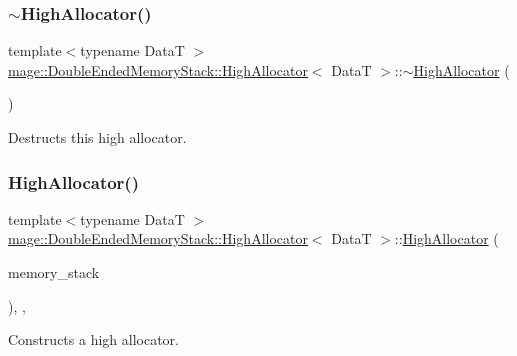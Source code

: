 \subsubsection{\texorpdfstring{$\sim$\+High\+Allocator()}{~HighAllocator()}}
{\footnotesize\ttfamily template$<$typename DataT $>$ \\
\hyperlink{classmage_1_1_double_ended_memory_stack_1_1_high_allocator}{mage\+::\+Double\+Ended\+Memory\+Stack\+::\+High\+Allocator}$<$ DataT $>$\+::$\sim$\hyperlink{classmage_1_1_double_ended_memory_stack_1_1_high_allocator}{High\+Allocator} (\begin{DoxyParamCaption}{ }\end{DoxyParamCaption})\hspace{0.3cm}{\ttfamily [default]}}

Destructs this high allocator. \hypertarget{classmage_1_1_double_ended_memory_stack_1_1_high_allocator_a6903aacd7e38597edb9145e73f3099be}{}\label{classmage_1_1_double_ended_memory_stack_1_1_high_allocator_a6903aacd7e38597edb9145e73f3099be} 
\subsubsection{\texorpdfstring{High\+Allocator()}{HighAllocator()}\hspace{0.1cm}{\footnotesize\ttfamily [4/4]}}
{\footnotesize\ttfamily template$<$typename DataT $>$ \\
\hyperlink{classmage_1_1_double_ended_memory_stack_1_1_high_allocator}{mage\+::\+Double\+Ended\+Memory\+Stack\+::\+High\+Allocator}$<$ DataT $>$\+::\hyperlink{classmage_1_1_double_ended_memory_stack_1_1_high_allocator}{High\+Allocator} (\begin{DoxyParamCaption}\item[{\hyperlink{namespacemage_a8769f9d670d6b585ea306cb1062af94b}{Not\+Null}$<$ \hyperlink{classmage_1_1_double_ended_memory_stack}{Double\+Ended\+Memory\+Stack} $\ast$ $>$}]{memory\+\_\+stack }\end{DoxyParamCaption})\hspace{0.3cm}{\ttfamily [explicit]}, {\ttfamily [private]}, {\ttfamily [noexcept]}}

Constructs a high allocator.


